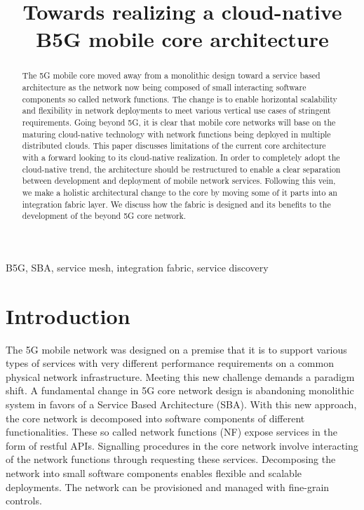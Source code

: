 \documentclass[conference]{IEEEtran}
\begin{document}
\title{Towards realizing a cloud-native B5G mobile core architecture}


\author{

}

\maketitle

\begin{abstract}

The 5G mobile core moved away from a monolithic design toward a service based
	architecture as the network now being composed of small interacting
	software components so called network functions. The change is to
	enable horizontal scalability and flexibility in network deployments to
	meet various vertical use cases of stringent requirements. Going beyond
	5G, it is clear that mobile core networks will base on the maturing
	cloud-native technology with network functions being deployed in
	multiple distributed clouds. This paper discusses limitations of the
	current core architecture with a forward looking to its cloud-native
	realization. In order to completely adopt the cloud-native trend, the
	architecture should be restructured to enable a clear separation
	between development and deployment of mobile network services.
	Following this vein, we make a holistic architectural change to the
	core by moving some of it parts into an integration fabric layer. We
	discuss how the fabric is designed and its benefits to the development
	of the beyond 5G core network.

\end{abstract}

\begin{IEEEkeywords}
B5G, SBA, service mesh, integration fabric, service discovery
\end{IEEEkeywords}

\section{Introduction}

The 5G mobile network was designed on a premise that it is to support various
types of services with very different performance requirements on a common
physical network infrastructure. Meeting this new challenge demands a paradigm
shift. A fundamental change in 5G core network design is abandoning monolithic
system in favors of a Service Based Architecture (SBA)\cite{5g}.  With this new
approach, the core network is decomposed into software components of different
functionalities. These so called network functions (NF) expose services in the
form of restful APIs.  Signalling procedures in the core network involve
interacting of the network functions through requesting these services.
Decomposing the network into small software components enables flexible and
scalable deployments. The network can be provisioned and managed with
fine-grain controls. 
\end{document}
